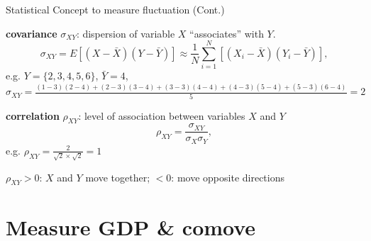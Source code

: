 \documentclass[11pt,aspectratio=169,usenames,dvipsnames]{beamer}
\let\tempone\itemize
\let\temptwo\enditemize
\renewenvironment{itemize}{\tempone\addtolength{\itemsep}{\fill}}{\temptwo}
\begin{document}
\begin{frame}{Statistical Concept to measure fluctuation (Cont.)}
\label{slide:Statistical_Concept_to_measure_fluctuation__Cont__}
    \begin{itemize}
        \item \textbf{covariance} $ \sigma_{XY} $: dispersion of variable $ X $ ``associates'' with $ Y $.
        \begin{equation}
        \label{eq:covariance}
            \sigma_{XY}
                = E[ ( X - \bar{X} ) ( Y - \bar{Y} ) ]
                \approx \frac{1}{N} \sum_{i=1}^{N} [ ( X_{i} - \bar{X} ) ( Y_{i} - \bar{Y} ) ]
        ,\end{equation}
        e.g. $ Y = \{ 2, 3, 4, 5, 6 \} $, $ \bar{Y} = 4 $, $ \sigma_{XY}
                = \frac{( 1-3 )( 2-4 ) + ( 2-3 )( 3-4 ) + ( 3-3 )( 4-4 ) + ( 4-3 )( 5-4 ) + ( 5-3 )( 6-4 )}{5} = 2$
        \item \textbf{correlation} $ \rho_{XY} $: level of association between variables $ X $ and $ Y $
        \begin{equation}
        \label{eq:correlation}
            \rho_{XY} = \frac{\sigma_{XY}}{\sigma_{X} \sigma_{Y}}
        ,\end{equation}
        e.g. $ \rho_{XY} = \frac{2}{\sqrt{2} \times \sqrt{2}} = 1$

        $ \rho_{XY} > 0 $: $ X $ and $ Y $ move \alert{together}; $ < 0 $: move \alert{opposite} directions
    \end{itemize}
\end{frame}

\section{Measure GDP \& comove}
\label{sec:Measure_GDP____comove}
\end{document}
